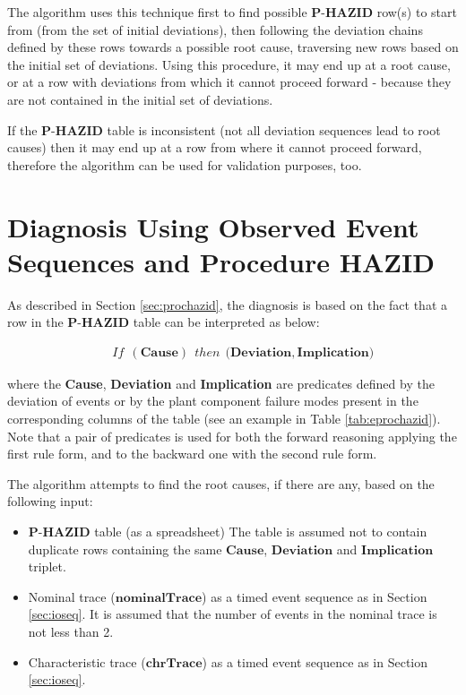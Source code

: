\documentclass[conference]{IEEEtran}
\begin{document}
The algorithm uses this technique first to find possible  $\textbf{P-HAZID}$ row(s) to start from (from the set of initial deviations), then following the deviation chains defined by these rows towards a possible root cause, traversing new rows based on the initial set of deviations. Using this procedure, it may end up at a root cause, or at a row with deviations from which it cannot proceed forward - because they are not contained in the initial set of deviations. 

If the $\textbf{P-HAZID}$ table is inconsistent (not all deviation sequences lead to root causes) then it may end up at a row from where it cannot proceed forward, therefore the algorithm can be used for validation purposes, too. 

%
\section{Diagnosis Using Observed Event Sequences and Procedure HAZID}
\label{sec:reasoning}

As described in Section \ref{sec:prochazid}, the diagnosis is based on the fact that a row in the $\textbf{P-HAZID}$
table can be interpreted as below:
\begin{small}
\begin{eqnarray*}
&& If~~\mathbf{(Cause)}~~then~~\mathbf{(Deviation,Implication})
\end{eqnarray*}
\end{small}
\noindent where the \textbf{Cause}, \textbf{Deviation} and \textbf{Implication}
 are predicates
 defined by the deviation of events or by the plant component failure modes
present in the corresponding columns of the table (see an example in Table \ref{tab:eprochazid}).
Note that a pair of predicates is used for both the forward reasoning
 applying the first rule form, and to the backward one with the second rule form.

 
The algorithm attempts to find the root causes, if there are any, based on the following input:
\begin{itemize}
	\item $\textbf{P-HAZID}$ table (as a spreadsheet) The table is assumed not to contain duplicate rows containing the same $\mathbf{Cause}$, $\mathbf{Deviation}$ and $\mathbf{Implication}$ triplet.
	\item Nominal trace ($\mathbf{nominalTrace}$) as a timed event sequence as in Section \ref{sec:ioseq}. It is assumed that the number of events in the nominal trace is not less than 2.
	\item Characteristic trace ($\mathbf{chrTrace}$) as a timed event sequence as in Section \ref{sec:ioseq}.
\end{itemize}
\end{document}
